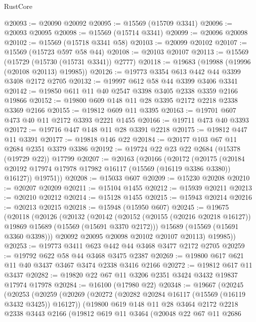 \begin{lexlean}{RustCore}
\begin{coremodule}
@20093 := @20090 @20092
@20095 := @15569 (@15709 @3341)
@20096 := @20093 @20095
@20098 := @15569 (@15714 @3341)
@20099 := @20096 @20098
@20102 := @15569 (@15718 @3341 @58)
@20103 := @20099 @20102
@20107 := @15569 (@15723 @597 @58 @44)
@20108 := @20103 @20107
@20113 := @15569 (@15729 (@15730 (@15731 @3341)) @2777)
@20118 := @19683 (@19988 (@19996 (@20108 @20113) @19985))
@20126 := @19773 @3354 @613 @442 @44 @3399 @3408 @2172 @2705
@20132 := @19997 @612 @58 @44 @3399 @3406 @3341
@20142 := @19850 @611 @11 @40 @2547 @3398 @3405 @2338 @3359 @2166 @19866
@20152 := @19800 @609 @148 @11 @28 @3395 @2172 @2218 @2338 @3369 @2166
@20155 := @19812 @609 @11 @3395
@20163 := @19701 @607 @473 @40 @11 @2172 @3393 @2221 @1455
@20166 := @19711 @473 @40 @3393
@20172 := @19716 @447 @148 @11 @28 @3391 @2218
@20175 := @19812 @447 @11 @3391
@20177 := @19818 @146 @22
@20184 := @20177 @103 @67 @11 @2684 @2351 @3379 @3386
@20192 := @19724 @22 @23 @22 @2684 (@15378 (@19729 @22)) @17799
@20207 := @20163
    (@20166
      (@20172
        (@20175 (@20184 @20192 @17974 @17978 @17982 @16117 (@15569 (@16119 @3386 @3380)) @16127))
        @19751))
@20208 := @15033 @607
@20209 := @15230 @20208
@20210 := @20207 @20209
@20211 := @15104 @1455
@20212 := @15939 @20211
@20213 := @20210 @20212
@20214 := @15128 @1455
@20215 := @15943 @20214
@20216 := @20213 @20215
@20218 := @15948 (@15950 @607)
@20245 := @19675
    (@20118
      (@20126
        (@20132
          (@20142
            (@20152 (@20155 (@20216 @20218 @16127)) @19869 @15689 (@15569 (@15691 @3370 @2172)))
            @15689
            (@15569 (@15691 @3360 @3398)))
          @20092
          @20095
          @20098
          @20102
          @20107
          @20113)
        @19985))
@20253 := @19773 @3411 @623 @442 @44 @3468 @3477 @2172 @2705
@20259 := @19792 @622 @58 @44 @3468 @3475 @2387
@20269 := @19800 @617 @621 @11 @40 @3437 @3467 @3474 @2338 @3416 @2166
@20272 := @19812 @617 @11 @3437
@20282 := @19820 @22 @67 @11 @3206 @2351 @3424 @3432 @19837 @17974 @17978
@20284 := @16100 (@17980 @22)
@20348 := @19667
    (@20245
      (@20253
        (@20259
          (@20269
            (@20272 (@20282 @20284 @16117 (@15569 (@16119 @3432 @3425)) @16127))
            (@19800
              @619
              @148
              @11
              @28
              @3464
              @2172
              @2218
              @2338
              @3443
              @2166
              (@19812
                @619
                @11
                @3464
                (@20048
                  @22
                  @67
                  @11
                  @2686

\end{coremodule}
\end{lexlean}
